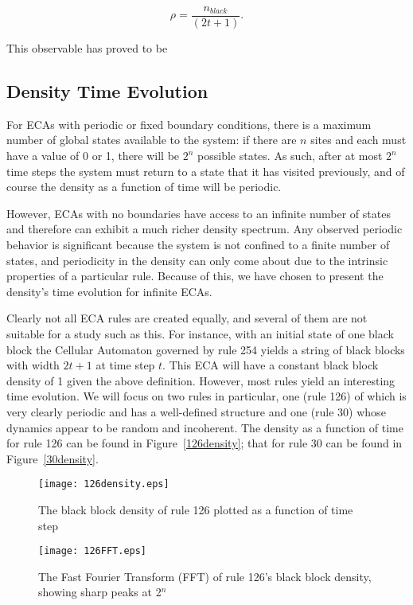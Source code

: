 \begin{equation}
    \rho = \frac{n_{black}}{(2t+1)}.
\end{equation}

This observable has proved to be 


\subsection{Density Time Evolution}
For ECAs with periodic or fixed boundary conditions, there is a
maximum number of global states available to the system: if there are
$n$ sites and each must have a value of 0 or 1, there will be $2^n$
possible states.
As such, after at most $2^n$ time steps the system must return to
a state that it has visited previously, and of course the density as a
function of time will be periodic.

However, ECAs with no boundaries have access to an infinite number of
states and therefore can exhibit a much richer density spectrum.
Any observed periodic behavior is significant because the system is
not confined to a finite number of states, and periodicity in the
density can only come about due to the intrinsic properties of a
particular rule.
Because of this, we have chosen to present the density's time
evolution for infinite ECAs.

Clearly not all ECA rules are created equally, and several of them are
not suitable for a study such as this.
For instance, with an initial state of one black block the Cellular
Automaton governed by rule 254 yields a string of black blocks with
width $2t+1$ at time step $t$.
This ECA will have a constant black block density of 1 given the above
definition.
However, most rules yield an interesting time evolution.
We will focus on two rules in particular, one (rule 126) of which is
very clearly periodic and has a well-defined structure and one (rule
30) whose dynamics appear to be random and incoherent.
The density as a function of time for rule 126 can be found in
Figure~\ref{126density}; that for rule 30 can be found in
Figure~\ref{30density}.


\begin{figure}
    \begin{minipage}[b]{0.49\textwidth}
        \centering
        \texttt{[image: 126density.eps]}
        \caption{\label{126density} The black block density of rule 126 plotted as a function of time step}
    \end{minipage}
    \hspace{0.5cm}
    \begin{minipage}[b]{0.49\textwidth}
        \centering
        \texttt{[image: 126FFT.eps]}
        \caption{\label{126FFT} The Fast Fourier Transform (FFT) of
        rule 126's black block density, showing sharp peaks at 2$^n$}
    \end{minipage}
\end{figure}



